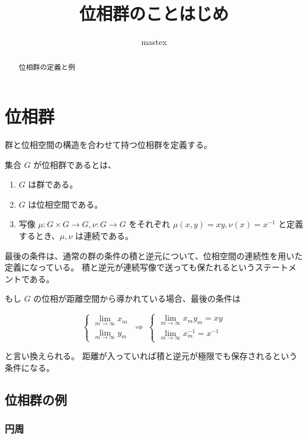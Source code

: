 \documentclass[uplatex,a4j,12pt,dvipdfmx]{jsarticle}
\title{
位相群のことはじめ
}
\author{
mastex
}
\begin{document}
\maketitle


\begin{abstract}
	位相群の定義と例
\end{abstract}

\section{位相群}

群と位相空間の構造を合わせて持つ位相群を定義する。

集合 $G$ が位相群であるとは、

\begin{enumerate}
	\item $G$ は群である。
	\item $G$ は位相空間である。
	\item 写像 $\mu: G \times G \to G, \nu: G \to G$ をそれぞれ $\mu(x,y)=xy, \nu(x) = x^{-1}$ と定義するとき、$\mu,\nu$ は連続である。
\end{enumerate}

最後の条件は、通常の群の条件の積と逆元について、位相空間の連続性を用いた定義になっている。
積と逆元が連続写像で送っても保たれるというステートメントである。


もし $G$ の位相が距離空間から導かれている場合、最後の条件は

\[
	\left\{
	\begin{array}{r}
		\displaystyle \lim_{ m \to \infty } x_{m} \\
		\displaystyle \lim_{ m \to \infty } y_{m}
	\end{array}
	\right.
	\ \Rightarrow \
	\left\{
	\begin{array}{r}
		\displaystyle \lim_{m \to \infty } x_{m} y_{m} = xy \\
		\displaystyle \lim_{m \to \infty } x_{m}^{-1} = x^{-1}
	\end{array}
	\right.
\]

と言い換えられる。
距離が入っていれば積と逆元が極限でも保存されるという条件になる。





\subsection{位相群の例}

\subsubsection{円周}
\end{document}
